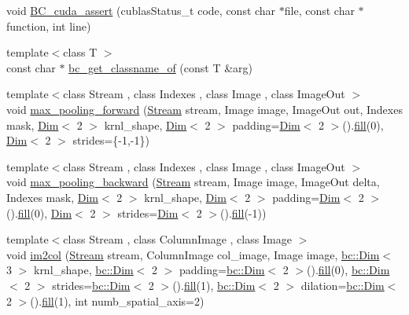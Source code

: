 \begin{DoxyCompactItemize}
void \hyperlink{namespacebc_ae3bc34767cd244414df270a9cb1b558e}{B\+C\+\_\+cuda\+\_\+assert} (cublas\+Status\+\_\+t code, const char $\ast$file, const char $\ast$function, int line)
\item 
{\footnotesize template$<$class T $>$ }\\const char $\ast$ \hyperlink{namespacebc_a10d0367c3c2e10f3f7c5d4f8b37c5270}{bc\+\_\+get\+\_\+classname\+\_\+of} (const T \&arg)
\item 
{\footnotesize template$<$class Stream , class Indexes , class Image , class Image\+Out $>$ }\\void \hyperlink{namespacebc_a679477ae62ae0b0b8af47e929fd3e879}{max\+\_\+pooling\+\_\+forward} (\hyperlink{classbc_1_1streams_1_1Stream}{Stream} stream, Image image, Image\+Out out, Indexes mask, \hyperlink{structbc_1_1Dim}{Dim}$<$ 2 $>$ krnl\+\_\+shape, \hyperlink{structbc_1_1Dim}{Dim}$<$ 2 $>$ padding=\hyperlink{structbc_1_1Dim}{Dim}$<$ 2 $>$().\hyperlink{tensor__iteralgos_8h_afd10a40f252abd24d1faa2752becdd53}{fill}(0), \hyperlink{structbc_1_1Dim}{Dim}$<$ 2 $>$ strides=\{-\/1,-\/1\})
\item 
{\footnotesize template$<$class Stream , class Indexes , class Image , class Image\+Out $>$ }\\void \hyperlink{namespacebc_ad90d6df9bf2db4ea2cfaaeb347a12634}{max\+\_\+pooling\+\_\+backward} (\hyperlink{classbc_1_1streams_1_1Stream}{Stream} stream, Image image, Image\+Out delta, Indexes mask, \hyperlink{structbc_1_1Dim}{Dim}$<$ 2 $>$ krnl\+\_\+shape, \hyperlink{structbc_1_1Dim}{Dim}$<$ 2 $>$ padding=\hyperlink{structbc_1_1Dim}{Dim}$<$ 2 $>$().\hyperlink{tensor__iteralgos_8h_afd10a40f252abd24d1faa2752becdd53}{fill}(0), \hyperlink{structbc_1_1Dim}{Dim}$<$ 2 $>$ strides=\hyperlink{structbc_1_1Dim}{Dim}$<$ 2 $>$().\hyperlink{tensor__iteralgos_8h_afd10a40f252abd24d1faa2752becdd53}{fill}(-\/1))
\item 
{\footnotesize template$<$class Stream , class Column\+Image , class Image $>$ }\\void \hyperlink{namespacebc_a92b9689f9fa30f3a6342800888b7cd3b}{im2col} (\hyperlink{classbc_1_1streams_1_1Stream}{Stream} stream, Column\+Image col\+\_\+image, Image image, \hyperlink{structbc_1_1Dim}{bc\+::\+Dim}$<$ 3 $>$ krnl\+\_\+shape, \hyperlink{structbc_1_1Dim}{bc\+::\+Dim}$<$ 2 $>$ padding=\hyperlink{structbc_1_1Dim}{bc\+::\+Dim}$<$ 2 $>$().\hyperlink{tensor__iteralgos_8h_afd10a40f252abd24d1faa2752becdd53}{fill}(0), \hyperlink{structbc_1_1Dim}{bc\+::\+Dim}$<$ 2 $>$ strides=\hyperlink{structbc_1_1Dim}{bc\+::\+Dim}$<$ 2 $>$().\hyperlink{tensor__iteralgos_8h_afd10a40f252abd24d1faa2752becdd53}{fill}(1), \hyperlink{structbc_1_1Dim}{bc\+::\+Dim}$<$ 2 $>$ dilation=\hyperlink{structbc_1_1Dim}{bc\+::\+Dim}$<$ 2 $>$().\hyperlink{tensor__iteralgos_8h_afd10a40f252abd24d1faa2752becdd53}{fill}(1), int numb\+\_\+spatial\+\_\+axis=2)

\end{DoxyCompactItemize}
